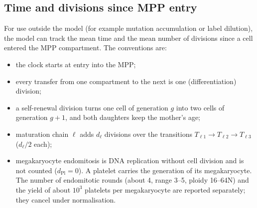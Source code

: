 \documentclass[11pt]{article}
\begin{document}
\subsection{Time and divisions since MPP entry}\label{sec:moments}
For use outside the model (for example mutation accumulation or label dilution), the model can track the mean time and the mean number of divisions since a cell entered the MPP compartment. The conventions are:
\begin{itemize}
\item the clock starts at entry into the MPP;
\item every transfer from one compartment to the next is one (differentiation) division;
\item a self-renewal division turns one cell of generation $g$ into two cells of generation $g+1$, and both daughters keep the mother's age;
\item maturation chain $\ell$ adds $d_\ell$ divisions over the transitions $T_{\ell1}\!\to\!T_{\ell2}\!\to\!T_{\ell3}$ ($d_\ell/2$ each);
\item megakaryocyte endomitosis is DNA replication without cell division and is not counted ($d_{\mathrm{Pl}}=0$). A platelet carries the generation of its megakaryocyte. The number of endomitotic rounds (about 4, range 3--5, ploidy 16--64N) and the yield of about $10^3$ platelets per megakaryocyte are reported separately; they cancel under normalisation.
\end{itemize}
\end{document}
